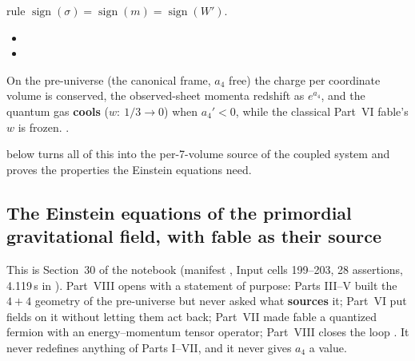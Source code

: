 rule $\operatorname{sign}(\sigma)=\operatorname{sign}(m)=\operatorname{sign}(W')$. 
\begin{itemize}
  \item {}
  \item {}
\end{itemize}
On the pre-universe (the canonical frame, $a_4$ free) the charge per coordinate volume is conserved, the
observed-sheet momenta redshift as $e^{a_4}$, and the quantum gas \textbf{cools} ($w:\ 1/3\to0$) when
$a_4'<0$, while the classical Part~VI fable's $w$ is frozen. 
.

 below turns all of this into the per-7-volume source of the coupled system and proves the
properties the Einstein equations need.

\subsection{The Einstein equations of the primordial gravitational field, with fable as their source}
\label{sec:4.2}

This is Section~30 of the notebook (manifest , Input cells 199--203,
28 assertions, 4.119\,s in ). Part~VIII opens with a
statement of purpose: Parts III--V built the $4+4$ geometry of the pre-universe but never asked what
\textbf{sources} it; Part~VI put fields on it without letting them act back; Part~VII made fable a
quantized fermion with an energy--momentum tensor operator; Part~VIII closes the loop
. It never redefines anything of Parts I--VII, and it never gives $a_4$ a
value.

